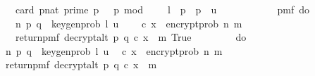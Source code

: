 \begin{isabellebody}
\ \ \ \ {\isachardoublequoteopen}card\ {\isacharbraceleft}{\kern0pt}{\isacharparenleft}{\kern0pt}p{\isacharcolon}{\kern0pt}{\isacharcolon}{\kern0pt}nat{\isacharparenright}{\kern0pt}{\isachardot}{\kern0pt}\ prime\ p\ {\isasymand}\ \ p\ mod\ {}\ {\isacharequal}{\kern0pt}\ {}\ {\isasymand}\ l\ {\isasymle}\ p\ {\isasymand}\ p\ {\isasymle}\ u{\isacharbraceright}{\kern0pt}\ {\isachargreater}{\kern0pt}\ {}{\isachardoublequoteclose}\ \isanewline
\ \ \ \ \isanewline
\ \ \ \ {\isachardoublequoteopen}pmf\ {\isacharparenleft}{\kern0pt}do\ {\isacharbraceleft}{\kern0pt}\isanewline
\ \ \ \ {\isacharparenleft}{\kern0pt}n{\isacharcomma}{\kern0pt}\ {\isacharparenleft}{\kern0pt}p{\isacharcomma}{\kern0pt}\ q{\isacharparenright}{\kern0pt}{\isacharparenright}{\kern0pt}\ {\isasymleftarrow}\ key{\isacharunderscore}{\kern0pt}gen{\isacharunderscore}{\kern0pt}prob\ l\ u{\isacharsemicolon}{\kern0pt}\isanewline
\ \ \ \ {\isacharparenleft}{\kern0pt}c{\isacharcomma}{\kern0pt}\ x{\isacharparenright}{\kern0pt}\ {\isasymleftarrow}\ {\isacharparenleft}{\kern0pt}encrypt{\isacharunderscore}{\kern0pt}prob\ n\ m{\isacharparenright}{\kern0pt}{\isacharsemicolon}{\kern0pt}\isanewline
\ \ \ \ return{\isacharunderscore}{\kern0pt}pmf\ {\isacharparenleft}{\kern0pt}decrypt{\isacharunderscore}{\kern0pt}alt\ p\ q\ {\isacharparenleft}{\kern0pt}c{\isacharcomma}{\kern0pt}\ x{\isacharparenright}{\kern0pt}\ {\isacharequal}{\kern0pt}\ m{\isacharparenright}{\kern0pt}{\isacharbraceright}{\kern0pt}{\isacharparenright}{\kern0pt}\ True\ {\isacharequal}{\kern0pt}\ {}{\isachardoublequoteclose}\isanewline
%
\isadelimproof
%
\endisadelimproof
%
\isatagproof
{}\isamarkupfalse%
\ {\isacharminus}{\kern0pt}\ \isanewline
\ \ \isamarkupfalse%
\ {\isachardoublequoteopen}do\ {\isacharbraceleft}{\kern0pt}\isanewline
\ \ {\isacharparenleft}{\kern0pt}n{\isacharcomma}{\kern0pt}\ {\isacharparenleft}{\kern0pt}p{\isacharcomma}{\kern0pt}\ q{\isacharparenright}{\kern0pt}{\isacharparenright}{\kern0pt}\ {\isasymleftarrow}\ key{\isacharunderscore}{\kern0pt}gen{\isacharunderscore}{\kern0pt}prob\ l\ u{\isacharsemicolon}{\kern0pt}\isanewline
\ \ {\isacharparenleft}{\kern0pt}c{\isacharcomma}{\kern0pt}\ x{\isacharparenright}{\kern0pt}\ {\isasymleftarrow}\ {\isacharparenleft}{\kern0pt}encrypt{\isacharunderscore}{\kern0pt}prob\ n\ m{\isacharparenright}{\kern0pt}{\isacharsemicolon}{\kern0pt}\isanewline
\ \ return{\isacharunderscore}{\kern0pt}pmf\ {\isacharparenleft}{\kern0pt}decrypt{\isacharunderscore}{\kern0pt}alt\ p\ q\ {\isacharparenleft}{\kern0pt}c{\isacharcomma}{\kern0pt}\ x{\isacharparenright}{\kern0pt}\ {\isacharequal}{\kern0pt}\ m{\isacharparenright}{\kern0pt}{\isacharbraceright}{\kern0pt}\ {\isacharequal}{\kern0pt}\ \isanewline

\end{isabellebody}
